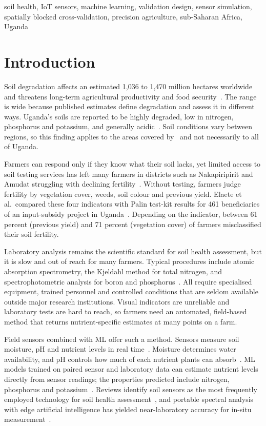 \documentclass[conference]{IEEEtran}
\begin{document}
\begin{IEEEkeywords}
soil health, IoT sensors, machine learning, validation design, sensor
simulation, spatially blocked cross-validation, precision agriculture,
sub-Saharan Africa, Uganda
\end{IEEEkeywords}

\section{Introduction}
Soil degradation affects an estimated 1,036 to 1,470 million hectares worldwide
and threatens long-term agricultural productivity and food security~\cite{ref1}.
The range is wide because published estimates define degradation and assess it
in different ways. Uganda's soils are reported to be highly degraded, low in
nitrogen, phosphorus and potassium, and generally acidic~\cite{ref2}. Soil
conditions vary between regions, so this finding applies to the areas covered
by~\cite{ref2} and not necessarily to all of Uganda.

Farmers can respond only if they know what their soil lacks, yet limited access
to soil testing services has left many farmers in districts such as
Nakapiripirit and Amudat struggling with declining fertility~\cite{ref3}.
Without testing, farmers judge fertility by vegetation cover, weeds, soil colour
and previous yield. Elaete et al.\ compared these four indicators with Palin
test-kit results for 461 beneficiaries of an input-subsidy project in
Uganda~\cite{ref2}. Depending on the indicator, between 61 percent (previous
yield) and 71 percent (vegetation cover) of farmers misclassified their soil
fertility.

Laboratory analysis remains the scientific standard for soil health assessment,
but it is slow and out of reach for many farmers. Typical procedures include
atomic absorption spectrometry, the Kjeldahl method for total nitrogen, and
spectrophotometric analysis for boron and phosphorus~\cite{ref1}. All require
specialised equipment, trained personnel and controlled conditions that are
seldom available outside major research institutions. Visual indicators are
unreliable and laboratory tests are hard to reach, so farmers need an automated,
field-based method that returns nutrient-specific estimates at many points on a
farm.

Field sensors combined with ML offer such a method. Sensors measure soil
moisture, pH and nutrient levels in real time~\cite{ref4}. Moisture determines
water availability, and pH controls how much of each nutrient plants can
absorb~\cite{ref5}. ML models trained on paired sensor and laboratory data can
estimate nutrient levels directly from sensor readings; the properties predicted
include nitrogen, phosphorus and potassium~\cite{ref4,ref6}. Reviews identify
soil sensors as the most frequently employed technology for soil health
assessment~\cite{ref7}, and portable spectral analysis with edge artificial
intelligence has yielded near-laboratory accuracy for in-situ
measurement~\cite{ref10,ref11}.
\end{document}
